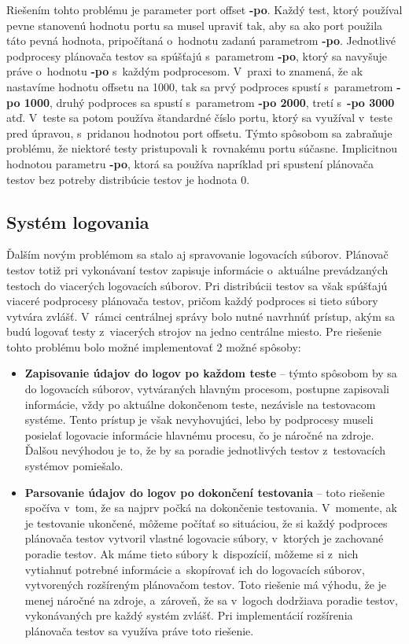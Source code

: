 Riešením tohto problému je parameter port offset \textbf{-po}. 
Každý test, ktorý používal pevne stanovenú hodnotu portu sa musel 
upraviť tak, aby sa ako port použila táto pevná hodnota, pripočítaná 
o~hodnotu zadanú parametrom \textbf{-po}.
Jednotlivé podprocesy plánovača testov sa spúšťajú s~parametrom 
\textbf{-po}, ktorý sa navyšuje práve o~hodnotu \textbf{-po} 
s~každým podprocesom. V~praxi to znamená, že ak nastavíme hodnotu 
offsetu na 1000, tak sa prvý podproces spustí s~parametrom
\textbf{-po 1000}, druhý podproces sa spustí s~parametrom \textbf{-po 2000}, 
tretí s~\textbf{-po 3000} atď. V~teste sa potom používa štandardné 
číslo portu, ktorý sa využíval v~teste pred úpravou, s~pridanou hodnotou 
port offsetu. Týmto spôsobom sa zabraňuje problému, že niektoré testy 
pristupovali k~rovnakému portu súčasne. Implicitnou hodnotou parametru 
\textbf{-po}, ktorá sa používa napríklad pri spustení plánovača testov
bez potreby distribúcie testov je hodnota 0. 

\subsection*{Systém logovania}
Ďalším novým problémom sa stalo aj spravovanie logovacích súborov. 
Plánovač testov totiž pri vykonávaní testov zapisuje informácie 
o~aktuálne prevádzaných testoch do viacerých logovacích súborov.
Pri distribúcii testov sa však spúšťajú viaceré podprocesy plánovača 
testov, pričom každý podproces si tieto súbory vytvára zvlášť. 
V~rámci centrálnej správy bolo nutné navrhnúť prístup, akým sa budú
logovať testy z~viacerých strojov na jedno centrálne miesto.
Pre riešenie tohto problému bolo možné implementovať 2 možné spôsoby:
\begin{itemize}
\item \textbf{Zapisovanie údajov do logov po každom teste} -- 
týmto spôsobom by sa do logovacích súborov, vytváraných hlavným procesom,
postupne zapisovali informácie, vždy po aktuálne dokončenom teste, 
nezávisle na testovacom systéme. Tento prístup je však nevyhovujúci, 
lebo by podprocesy museli posielať logovacie informácie hlavnému procesu, 
čo je náročné na zdroje. Ďalšou nevýhodou je to, že by sa poradie 
jednotlivých testov z~testovacích systémov pomiešalo.
\item \textbf{Parsovanie údajov do logov po dokončení testovania} -- 
toto riešenie spočíva v~tom, že sa najprv počká na dokončenie testovania. 
V~momente, ak je testovanie ukončené, môžeme počítať so situáciou,
že si každý podproces plánovača testov vytvoril vlastné logovacie súbory, 
v~ktorých je zachované poradie testov. Ak máme tieto súbory k~dispozícií, 
môžeme si z~nich vytiahnuť potrebné informácie a~skopírovať ich do 
logovacích súborov, vytvorených rozšíreným plánovačom testov. 
Toto riešenie má výhodu, že je menej náročné na zdroje, a~zároveň,
že sa v~logoch dodržiava poradie testov, vykonávaných pre každý systém zvlášť. 
Pri implementácií rozšírenia plánovača testov sa využíva práve toto riešenie.
\end{itemize} 

